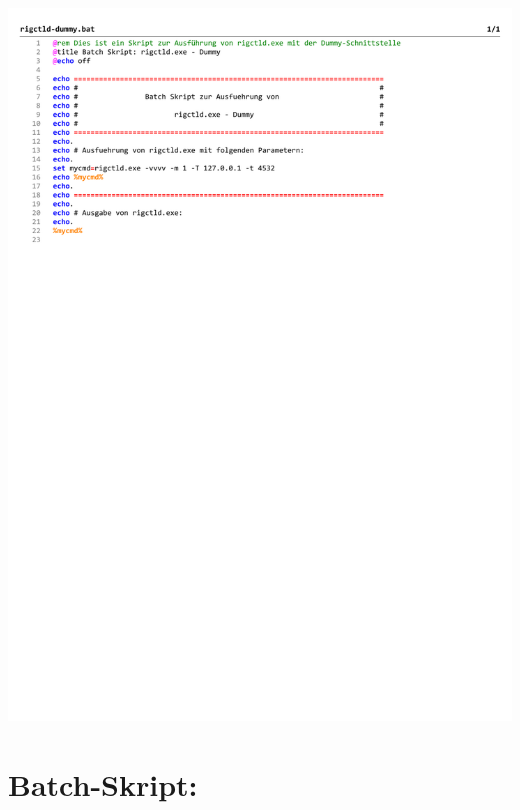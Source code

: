 \begin{center}
	\includegraphics[width=1\textwidth]{./appendicies/rigctld-dummy}
\end{center}


\chapter{Batch-Skript: }
\label{chap:rotctlddummybat}

